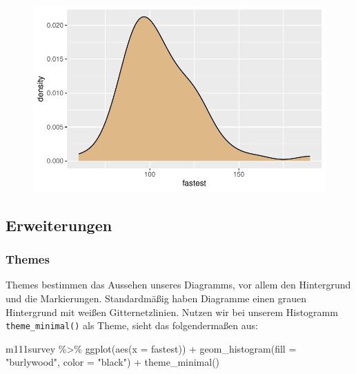 \documentclass[
  letterpaper,
  DIV=11,
  numbers=noendperiod]{scrartcl}
\newenvironment{Shaded}{\begin{snugshade}}{\end{snugshade}}
\newcommand{\AttributeTok}[1]{\textcolor[rgb]{0.40,0.45,0.13}{#1}}
\newcommand{\FunctionTok}[1]{\textcolor[rgb]{0.28,0.35,0.67}{#1}}
\newcommand{\NormalTok}[1]{\textcolor[rgb]{0.00,0.23,0.31}{#1}}
\newcommand{\SpecialCharTok}[1]{\textcolor[rgb]{0.37,0.37,0.37}{#1}}
\newcommand{\StringTok}[1]{\textcolor[rgb]{0.13,0.47,0.30}{#1}}
\begin{document}
\begin{figure}[H]

{\centering \includegraphics{05-visualisierung_files/figure-pdf/unnamed-chunk-8-1.pdf}

}

\end{figure}

\hypertarget{erweiterungen}{%
\subsection{Erweiterungen}\label{erweiterungen}}

\hypertarget{themes}{%
\subsubsection{Themes}\label{themes}}

Themes bestimmen das Aussehen unseres Diagramms, vor allem den
Hintergrund und die Markierungen. Standardmäßig haben Diagramme einen
grauen Hintergrund mit weißen Gitternetzlinien. Nutzen wir bei unserem
Histogramm \texttt{theme\_minimal()} als Theme, sieht das folgendermaßen
aus:

\begin{Shaded}
\begin{Highlighting}[]
\NormalTok{m111survey }\SpecialCharTok{\%\textgreater{}\%} 
  \FunctionTok{ggplot}\NormalTok{(}\FunctionTok{aes}\NormalTok{(}\AttributeTok{x =}\NormalTok{ fastest)) }\SpecialCharTok{+}
  \FunctionTok{geom\_histogram}\NormalTok{(}\AttributeTok{fill =} \StringTok{"burlywood"}\NormalTok{, }\AttributeTok{color =} \StringTok{"black"}\NormalTok{) }\SpecialCharTok{+}
  \FunctionTok{theme\_minimal}\NormalTok{()}
\end{Highlighting}
\end{Shaded}
\end{document}
